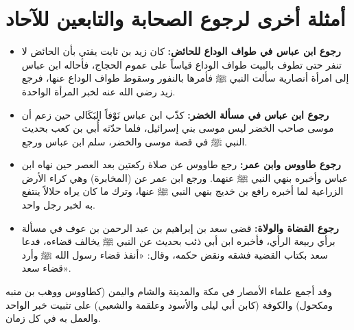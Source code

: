\section{أمثلة أخرى لرجوع الصحابة والتابعين للآحاد}
\begin{itemize}
    \item \textbf{رجوع ابن عباس في طواف الوداع للحائض:} كان زيد بن ثابت يفتي بأن الحائض لا تنفر حتى تطوف بالبيت طواف الوداع قياساً على عموم الحجاج، فأحاله ابن عباس إلى امرأة أنصارية سألت النبي ﷺ فأمرها بالنفور وسقوط طواف الوداع عنها، فرجع زيد رضي الله عنه لخبر المرأة الواحدة.
    \item \textbf{رجوع ابن عباس في مسألة الخضر:} كذّب ابن عباس نَوْفاً البَكَالي حين زعم أن موسى صاحب الخضر ليس موسى بني إسرائيل، فلما حدّثه أُبي بن كعب بحديث النبي ﷺ في قصة موسى والخضر، سلم ابن عباس ورجع.
    \item \textbf{رجوع طاووس وابن عمر:} رجع طاووس عن صلاة ركعتين بعد العصر حين نهاه ابن عباس وأخبره بنهي النبي ﷺ عنهما. ورجع ابن عمر عن (المخابرة) وهي كراء الأرض الزراعية لما أخبره رافع بن خديج بنهي النبي ﷺ عنها، وترك ما كان يراه حلالاً ينتفع به لخبر رجل واحد.
    \item \textbf{رجوع القضاة والولاة:} قضى سعد بن إبراهيم بن عبد الرحمن بن عوف في مسألة برأي ربيعة الرأي، فأخبره ابن أبي ذئب بحديث عن النبي ﷺ يخالف قضاءه، فدعا سعد بكتاب القضية فشقه ونقض حكمه، وقال: «أنفذ قضاء رسول الله ﷺ وأرد قضاء سعد».
\end{itemize}
وقد أجمع علماء الأمصار في مكة والمدينة والشام واليمن (كطاووس ووهب بن منبه ومكحول) والكوفة (كابن أبي ليلى والأسود وعلقمة والشعبي) على تثبيت خبر الواحد والعمل به في كل زمان.

